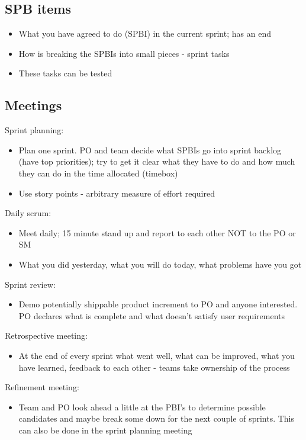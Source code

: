 \documentclass{article}[18pt]
\begin{document}
\subsection{SPB items}
\begin{itemize}
	\item What you have agreed to do (SPBI) in the current sprint; has an end
	\item How is breaking the SPBIs into small pieces - sprint tasks
	\item These tasks can be tested
\end{itemize}
\subsection{Meetings}
Sprint planning:
\begin{itemize}
	\item Plan one sprint. PO and team decide what SPBIs go into sprint backlog (have top priorities); try to get it clear what they have to do and how much they can do in the time allocated (timebox)
	\item Use story points - arbitrary measure of effort required
\end{itemize}
Daily scrum:
\begin{itemize}
	\item Meet daily; 15 minute stand up and report to each other NOT to the PO or SM
	\item What you did yesterday, what you will do today, what problems have you got
\end{itemize}
Sprint review:
\begin{itemize}
	\item Demo potentially shippable product increment to PO and anyone interested. PO declares what is complete and what doesn't satisfy user requirements
\end{itemize}
Retrospective meeting:
\begin{itemize}
	\item At the end of every sprint what went well, what can be improved, what you have learned, feedback to each other - teams take ownership of the process
\end{itemize}
Refinement meeting:
\begin{itemize}
	\item Team and PO look ahead a little at the PBI's to determine possible candidates and maybe break some down for the next couple of sprints. This can also be done in the sprint planning meeting
\end{itemize}
\end{document}
